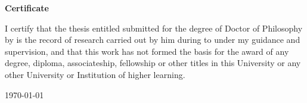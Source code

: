 \newpage
\thispagestyle{empty}
\begin{center}{\Huge \bf Certificate}\end{center}
\vspace{2cm}

I certify that the thesis entitled \emph{\thetitle} submitted for the
degree of Doctor of Philosophy by \emph{\theauthor} is the record of
research carried out by him during \emph{\thethesisstartdate} to
\emph{\thethesisenddate} under my guidance and supervision, and that
this work has not formed the basis for the award of any degree,
diploma, associateship, fellowship or other titles in this University
or any other University or Institution of higher learning.\newline

\vspace{1cm} 
\noindent\theadvisor\hfil\today\break
\theadvisorsalutation\hfil\break
\theadvisordesignation\hfil\break
\theadvisoraddress\hfil\break




